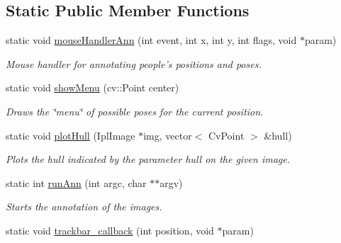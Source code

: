 \subsection*{Static Public Member Functions}
\begin{DoxyCompactItemize}
\item 
\hypertarget{classannotationsHandle_a2c3529417ce5c15e00e8bd8679a4db27}{
static void \hyperlink{classannotationsHandle_a2c3529417ce5c15e00e8bd8679a4db27}{mouseHandlerAnn} (int event, int x, int y, int flags, void $\ast$param)}
\label{classannotationsHandle_a2c3529417ce5c15e00e8bd8679a4db27}

\begin{DoxyCompactList}\small\item\em Mouse handler for annotating people's positions and poses. \item\end{DoxyCompactList}\item 
\hypertarget{classannotationsHandle_a2510d1948d3138df3331c91ddcd49b95}{
static void \hyperlink{classannotationsHandle_a2510d1948d3138df3331c91ddcd49b95}{showMenu} (cv::Point center)}
\label{classannotationsHandle_a2510d1948d3138df3331c91ddcd49b95}

\begin{DoxyCompactList}\small\item\em Draws the \char`\"{}menu\char`\"{} of possible poses for the current position. \item\end{DoxyCompactList}\item 
\hypertarget{classannotationsHandle_aa51b2586e2fc41b010b6d4b1a4c4beb4}{
static void \hyperlink{classannotationsHandle_aa51b2586e2fc41b010b6d4b1a4c4beb4}{plotHull} (IplImage $\ast$img, vector$<$ CvPoint $>$ \&hull)}
\label{classannotationsHandle_aa51b2586e2fc41b010b6d4b1a4c4beb4}

\begin{DoxyCompactList}\small\item\em Plots the hull indicated by the parameter {\ttfamily hull} on the given image. \item\end{DoxyCompactList}\item 
static int \hyperlink{classannotationsHandle_a226e4ef5f47790d98002d2567659a62e}{runAnn} (int argc, char $\ast$$\ast$argv)
\begin{DoxyCompactList}\small\item\em Starts the annotation of the images. \item\end{DoxyCompactList}\item 
\hypertarget{classannotationsHandle_ac8d0365f010294def2757bf31ba1207f}{
static void \hyperlink{classannotationsHandle_ac8d0365f010294def2757bf31ba1207f}{trackbar\_\-callback} (int position, void $\ast$param)}
\label{classannotationsHandle_ac8d0365f010294def2757bf31ba1207f}


\end{DoxyCompactItemize}

